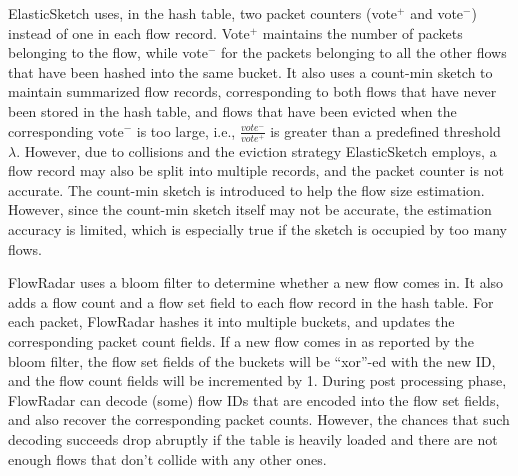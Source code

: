 ElasticSketch\cite{yang_elastic_2018} uses, in the hash table, 
two packet counters (vote$^{+}$ and vote$^{-}$) instead of one in each flow record. 
Vote$^{+}$ maintains the number of packets belonging to the flow, while vote$^{-}$ for the packets belonging to all the 
other flows that have been hashed into the same bucket. It also uses a count-min sketch\cite{cormode_countmin_2005} 
to maintain summarized flow records, corresponding to both flows that have never been stored in the hash table, 
and flows that have been evicted when the corresponding vote$^{-}$ is too large, i.e., $\frac{vote^{-}}{vote^{+}}$ 
is greater than a predefined threshold $\lambda$. 
However, due to collisions and the eviction strategy ElasticSketch employs, a flow record may also be split 
into multiple records, and the packet counter is not accurate. The count-min sketch is introduced to help the flow size 
estimation. However, since the count-min sketch itself may not be accurate, the estimation accuracy is limited,  
which is especially true if the sketch is occupied by too many flows. 


FlowRadar\cite{li_flowradar:_2016} uses a bloom filter\cite{bloom_space/time_1970} to determine 
whether a new flow comes in. It also adds a flow count and a flow set field to each flow record in the hash table. 
For each packet, FlowRadar hashes it into multiple buckets, and updates the corresponding packet count fields. 
If a new flow comes in as reported by the bloom filter, the flow set fields of the buckets will be ``xor''-ed with the new ID, 
and the flow count fields will be incremented by 1. 
During post processing phase, FlowRadar can decode (some) flow IDs that are encoded into the flow set fields, and also recover the corresponding packet counts. 
However, the chances that such decoding succeeds drop abruptly if the table is heavily loaded and there are not enough flows that don't collide with any other ones.



